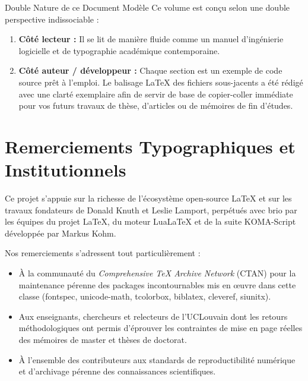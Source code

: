 
\begin{boiteSynthese}{Double Nature de ce Document Modèle}
  Ce volume est conçu selon une double perspective indissociable :
  \begin{enumerate}
    \item \textbf{Côté lecteur :} Il se lit de manière fluide comme un manuel d'ingénierie logicielle et de typographie académique contemporaine.
    \item \textbf{Côté auteur / développeur :} Chaque section est un exemple de code source prêt à l'emploi. Le balisage \LaTeX{} des fichiers sous-jacents a été rédigé avec une clarté exemplaire afin de servir de base de copier-coller immédiate pour vos futurs travaux de thèse, d'articles ou de mémoires de fin d'études.
  \end{enumerate}
\end{boiteSynthese}

\vspace{1cm}

\section*{Remerciements Typographiques et Institutionnels}

Ce projet s'appuie sur la richesse de l'écosystème open-source \LaTeX{} et sur les travaux fondateurs de Donald Knuth et Leslie Lamport, perpétués avec brio par les équipes du projet \LaTeX{}, du moteur Lua\LaTeX{} et de la suite KOMA-Script développée par Markus Kohm.

Nos remerciements s'adressent tout particulièrement :
\begin{itemize}
  \item À la communauté du \emph{Comprehensive \TeX{} Archive Network} (CTAN) pour la maintenance pérenne des packages incontournables mis en œuvre dans cette classe (\textsf{fontspec}, \textsf{unicode-math}, \textsf{tcolorbox}, \textsf{biblatex}, \textsf{cleveref}, \textsf{siunitx}).
  \item Aux enseignants, chercheurs et relecteurs de l'UCLouvain dont les retours méthodologiques ont permis d'éprouver les contraintes de mise en page réelles des mémoires de master et thèses de doctorat.
  \item À l'ensemble des contributeurs aux standards de reproductibilité numérique et d'archivage pérenne des connaissances scientifiques.
\end{itemize}

